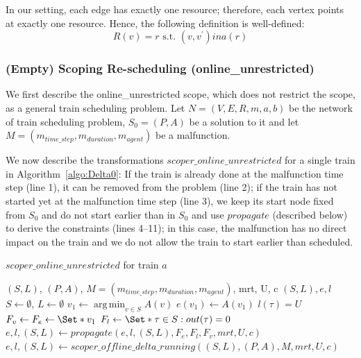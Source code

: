 \documentclass{article}
\DeclareMathOperator*{\argmin}{arg\,min}
\begin{document}
In our setting, each edge has exactly one resource; therefore, each vertex points at exactly one resource. Hence, the following definition is well-defined:
\begin{equation}
    R(v) = r \textrm{ s.t. } (v,v^\prime) in a(r)
\end{equation}


\subsubsection{(Empty) Scoping Re-scheduling (online\_unrestricted)} \label{subsubsec:scope_online_unrestricted}

We first describe the online\_unrestricted scope, which does not restrict the scope, as a general train scheduling problem. Let $N=(V,E,R,m,a,b)$ be the network of train scheduling problem, $S_0=(P,A)$ be a solution to it and let $M=(m_{time\_step},m_{duration},m_{agent})$ be a malfunction.

We now describe the transformations $scoper\_online\_unrestricted$ for a single train in Algorithm~\ref{algo:Delta0}:
If the train is already done at the malfunction time step (line 1), it can be removed from the problem (line 2);
if the train has not started yet at the malfunction time step (line 3), we keep its start node fixed from $S_0$ and do not start earlier than in $S_0$ and use $propagate$ (described below) to derive the constraints (lines 4--11); in this case, the malfunction has no direct impact on the train and we do not allow the train to start earlier than scheduled.






\begin{algorithm}
	\caption{$scoper\_online\_unrestricted$ for train $a$} \label{algo:Delta0}
	\begin{algorithmic}[1]
		\Require $(S,L)$, $(P,A)$, $M=(m_{time\_step},m_{duration},m_{agent})$, mrt, U, c
	    \Ensure $(S,L),e,l$
            \State $S\leftarrow \emptyset$, $L \leftarrow \emptyset$
            \State $v_1 \leftarrow \argmin_{v\in S} A(v)$
            \State $e(v_1) \leftarrow A(v_1)$
                \State $l(\tau)=U$
            \EndFor
            \State $F_v \leftarrow F_e \leftarrow \Set*{v_1}$
            \State $F_l \leftarrow \Set*{\tau \in S: out(\tau)=0}$
            \State $e,l,(S,L) \leftarrow propagate(e,l,(S,L),F_e,F_l,F_v, mrt, U, c)$
        \Else
            \State $e,l,(S,L) \leftarrow scoper\_offline\_delta\_running((S,L), (P,A), M, mrt, U, c)$
        \EndIf
\end{algorithmic}
\end{algorithm}
\end{document}
